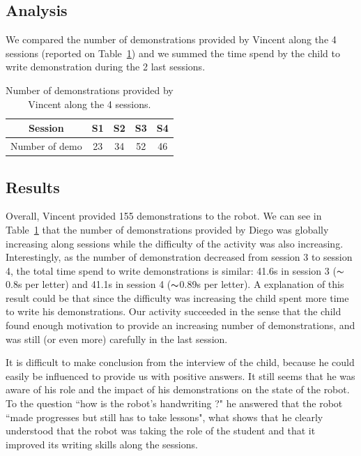 \documentclass{sig-alternate}
\begin{document}
\subsection{Analysis}

We compared the number of demonstrations provided by Vincent along the 4 sessions (reported on Table~\ref{table:vincent_sess}) and we summed the time spend by the child to write demonstration during the 2 last sessions.

\begin{table}
    \centering
    \begin{tabular}{|c|c|c|c|c|}
        \hline
        Session & S1 & S2 & S3 & S4\\ \hline
        Number of demo & 23 & 34 & 52 & 46\\ \hline

    \end{tabular}
    \caption{\small Number of demonstrations provided by Vincent along the 4 sessions.}
    \label{table:vincent_sess}
\end{table}

\subsection{Results}
Overall, Vincent provided 155 demonstrations to the robot. We can see in Table~\ref{table:vincent_sess} that the number of demonstrations provided by Diego was globally increasing along sessions while the difficulty of the activity was also increasing. Interestingly, as the number of demonstration decreased from session 3 to session 4, the total time spend to write demonstrations is similar: 41.6s in session 3 ($\thicksim$0.8s per letter) and 41.1s in session 4 ($\thicksim$0.89s per letter). A explanation of this result could be that since the difficulty was increasing the child spent more time to write his demonstrations. Our activity succeeded in the sense that the child found enough motivation to provide an increasing number of demonstrations, and was still (or even more) carefully in the last session.

It is difficult to make conclusion from the interview of the child, because he could easily be influenced to provide us with positive answers. It still seems that he was aware of his role and the impact of his demonstrations on the state of the robot. To the question ``how is the robot's handwriting ?" he answered that the robot ``made progresses but still has to take lessons", what shows that he clearly understood that the robot was taking the role of the student and that it improved its writing skills along the sessions.
 
\end{document}
